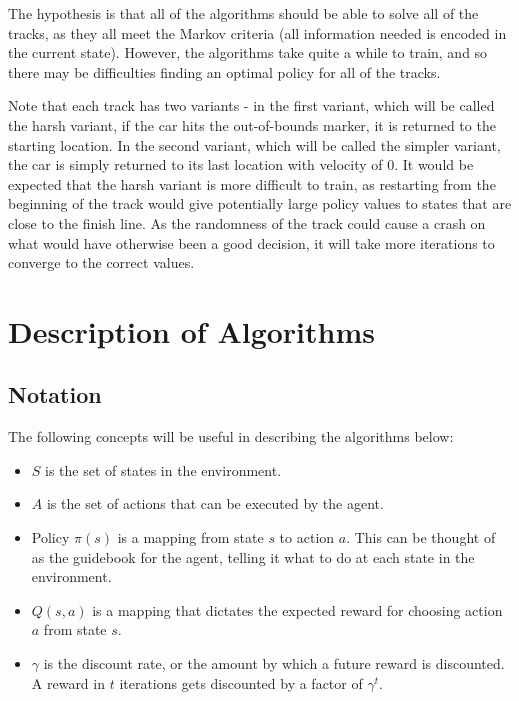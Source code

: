 \documentclass{amsart}
\begin{document}
    The hypothesis is that all of the algorithms should be able to solve all of the tracks, as they all meet the
    Markov criteria (all information needed is encoded in the current state). However, the algorithms take quite a
    while to train, and so there may be difficulties finding an optimal policy for all of the tracks.

    Note that each track has two variants - in the first variant, which will be called the harsh variant,
    if the car hits the out-of-bounds marker, it is returned to the starting location. In the second variant,
    which will be called the simpler variant, the car is simply returned to its last location with velocity of 0.
    It would be expected that the harsh variant is more difficult to train, as restarting from the beginning of
    the track would give potentially large policy values to states that are close to the finish line. As the randomness
    of the track could cause a crash on what would have otherwise been a good decision, it will take more iterations  to
    converge to the correct values.

    \section{Description of Algorithms}
    \subsection{Notation}
    The following concepts will be useful in describing the algorithms below:
    \begin{itemize}
        \item $S$ is the set of states in the environment.
        \item $A$ is the set of actions that can be executed by the agent.
        \item Policy $\pi(s)$ is a mapping from state $s$ to action $a$. This can be thought of as the
        guidebook for the agent, telling it what to do at each state in the environment.
        \item $Q(s, a)$ is a mapping that dictates the expected reward for choosing action $a$ from state $s$.
        \item $\gamma$ is the discount rate, or the amount by which a future reward is discounted. A reward
        in $t$ iterations gets discounted by a factor of $\gamma^t$.
    \end{itemize}
\end{document}
